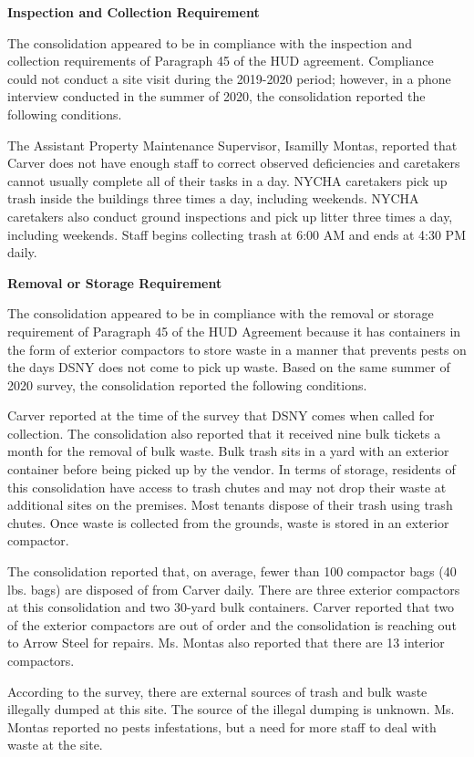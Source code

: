 
\textbf{Inspection and Collection Requirement}

The consolidation appeared to be in compliance with the inspection and collection requirements of Paragraph 45 of the HUD agreement. Compliance could not conduct a site visit during the 2019-2020 period; however, in a phone interview conducted in the summer of 2020, the consolidation reported the following conditions.

The Assistant Property Maintenance Supervisor, Isamilly Montas, reported that Carver does not have enough staff to correct observed deficiencies and caretakers cannot usually complete all of their tasks in a day. NYCHA caretakers pick up trash inside the buildings three times a day, including weekends. NYCHA caretakers also conduct ground inspections and pick up litter three times a day, including weekends. Staff begins collecting trash at 6:00 AM and ends at 4:30 PM daily.

\textbf{Removal or Storage Requirement}

The consolidation appeared to be in compliance with the  removal or storage requirement of Paragraph  45 of the HUD Agreement because it has containers in the form of exterior compactors to store waste in a manner that prevents pests on the days DSNY does not come to pick up waste. Based on the same summer of  2020 survey, the consolidation reported the following conditions.

Carver reported at the time of the survey that DSNY comes when called for collection. The consolidation also reported that it received nine bulk tickets a month for the removal of bulk waste. Bulk trash sits in a yard with an exterior container before being picked up by the vendor. In terms of storage, residents of this consolidation have access to trash chutes and may not drop their waste at additional sites on the premises. Most tenants dispose of their trash using trash chutes. Once waste is collected from the grounds, waste is stored in an exterior compactor. 

The consolidation reported that, on average, fewer than 100 compactor bags (40 lbs. bags) are disposed of from Carver daily. There are three exterior compactors at this consolidation and two 30-yard bulk containers. Carver reported that two of the exterior compactors are out of order and the consolidation  is reaching out to Arrow Steel for repairs. Ms. Montas also reported that there are 13 interior compactors.

According to the survey, there are external sources of trash and bulk waste illegally dumped at this site. The source of the illegal dumping is unknown. Ms. Montas reported no pests infestations, but a need for more staff to deal with waste at the site.